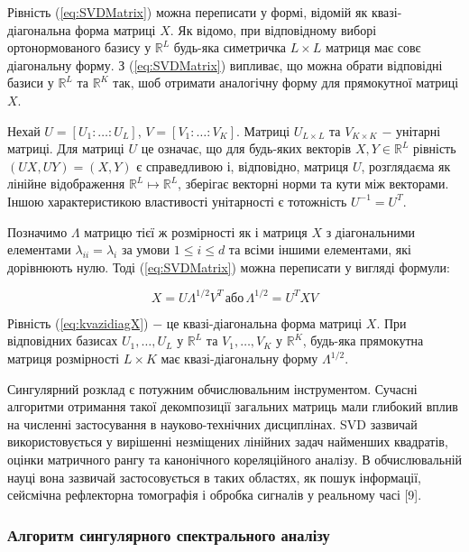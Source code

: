 \vspace{1.5em}

Рівність (\ref{eq:SVDMatrix}) можна переписати у формі, відомій як квазі-діагональна форма матриці $X$. Як відомо, при відповідному виборі ортонормованого базису у $\mathds{R}^{L}$ будь-яка симетричка $L \times L$ матриця має совє діагональну форму. З (\ref{eq:SVDMatrix}) випливає, що можна обрати відповідні базиси у $\mathds{R}^{L}$ та $\mathds{R}^{K}$ так, шоб отримати аналогічну форму для прямокутної матриці $X$.

Нехай $U = [U_{1}: \dots : U_{L}]$, $V = [V_{1}: \dots : V_{K}]$. Матриці $U_{L \times L}$ та $V_{K \times K}$ $-$ унітарні матриці. Для матриці $U$ це означає, що для будь-яких векторів $X,Y \in \mathds{R}^{L}$ рівність $(UX, UY) = (X, Y)$ є справедливою і, відповідно, матриця $U$, розглядаєма як лінійне відображення $\mathds{R}^{L} \mapsto \mathds{R}^{L}$, зберігає векторні норми та кути між векторами. Іншою характеристикою властивості унітарності є тотожність $U^{-1}=U^{T}$.

Позначимо $\Lambda$ матрицю тієї ж розмірності як і матриця $X$ з діагональними елементами $\lambda_{ii} = \lambda_{i}$ за умови $1 \le i \le d$ та всіми іншими елементами, які дорівнюють нулю. Тоді (\ref{eq:SVDMatrix}) можна переписати у вигляді формули:

\begin{equation}\label{eq:kvazidiagX}
X = U\Lambda^{1/2}V^{T} \, \text{або} \, \Lambda^{1/2}=U^{T}XV
\end{equation}

\vspace{1.5em}

Рівність (\ref{eq:kvazidiagX}) $-$ це квазі-діагональна форма матриці $X$. При відповідних базисах $U_{1}, \dots, U_{L}$ у $\mathds{R}^{L}$ та $V_{1}, \dots, V_{K}$ у $\mathds{R}^{K}$, будь-яка прямокутна матриця розмірності $L \times K$ має квазі-діагональну форму $\Lambda^{1/2}$.

Сингулярний розклад є потужним обчислювальним інструментом. Сучасні алгоритми отримання такої декомпозиції загальних матриць мали глибокий вплив на численні застосування в науково-технічних дисциплінах. SVD зазвичай використовується у вирішенні незміщених лінійних задач найменших квадратів, оцінки матричного рангу та канонічного кореляційного аналізу. В обчислювальній науці вона зазвичай застосовується в таких областях, як пошук інформації, сейсмічна рефлекторна томографія і обробка сигналів у реальному часі [9].

\subsubsection{Алгоритм сингулярного спектрального аналізу}

